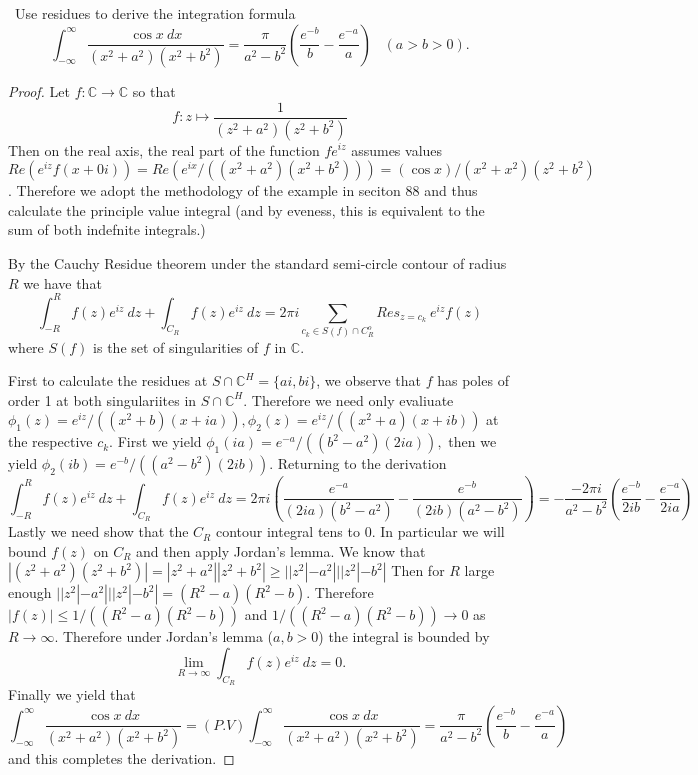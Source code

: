 \documentclass[11pt]{amsart}
\theoremstyle{definition}
\numberwithin{theorem}{section}
\numberwithin{definition}{section}
\numberwithin{equation}{section}
\newcommand{\parens}[1]{ \left( #1 \right) }
\begin{document}
\medskip {}\ Use residues to derive the integration formula
\begin{equation*}
	\int_{-\infty}^\infty \frac{\cos x\ dx}{(x^2 + a^2)(x^2 + b^2)} = \frac{\pi}{a^2 - b^2} \left(\frac{e^{-b}}{b} - \frac{e^{-a}}{a}\right) \;\;\; (a > b > 0).
\end{equation*}
\begin{proof}
	Let $f: \mathbb{C} \to \mathbb{C}$ so that 
	\begin{equation*}
		f: z \mapsto \frac{1}{(z^2 + a^2)(z^2 + b^2)}
	\end{equation*}
	Then on the real axis, the real part of the  function $fe^{iz}$ assumes values $Re(e^{iz}f(x + 0i)) = Re(e^{ix}/((x^2 + a^2)(x^2 + b^2))) = (\cos x)/(x^2 + x^2)(z^2 + b^2)$. Therefore we adopt the methodology of the example in seciton 88 and thus calculate the principle value integral (and by eveness, this is equivalent to the sum of both indefnite integrals.)

	By the Cauchy Residue theorem under the standard semi-circle contour of radius $R$ we have that
	\begin{equation*}
		\int_{-R}^R f(z)e^{iz}\ dz + \int_{C_R} f(z) e^{iz}\ dz = 2\pi i \sum_{c_k \in S(f) \cap C_R^o} Res_{z=c_k}\ e^{iz} f(z)
	\end{equation*}
	where $S(f)$ is the set of singularities of $f$ in $\mathbb{C}.$

	First to calculate the residues at $S \cap \mathbb{C}^H = \{ai, bi\}$, we observe that $f$ has poles of order 1 at both singulariites in $S \cap \mathbb{C}^H$. Therefore we need only evaliuate $\phi_1(z) = e^{iz}/((x^2 + b)(x+ ia)), \phi_2(z) = e^{iz}/((x^2 + a)(x + ib))$ at the respective $c_k$. First we yield $\phi_1(ia) = e^{-a}/((b^2 -a^2)(2ia)),$ then we yield $\phi_2(ib) = e^{-b}/((a^2 - b^2)(2ib))$. Returning to the derivation
	\begin{equation*}
		\int_{-R}^R f(z)e^{iz}\ dz + \int_{C_R} f(z) e^{iz}\ dz = 2\pi i \parens{\frac{e^{-a}}{(2ia)(b^2 - a^2)} - \frac{e^{-b}}{(2ib)(a^2 - b^2)}} = -\frac{-2 \pi i}{a^2 - b^2} \parens{\frac{e^{-b}}{2ib} - \frac{e^{-a}}{2ia}} 
	\end{equation*}
	Lastly we need show that the $C_R$ contour integral tens to $0$.  In particular we will  bound $f(z)$ on $C_R$
	and then apply Jordan's lemma.  We know that $|(z^2 + a^2)(z^2 + b^2)| = |z^2 + a^2||z^2 + b^2| \geq ||z^2| - a^2|||z^2| - b^2|$ Then for $R$ large enough $||z^2| - a^2|||z^2| - b^2| = (R^2 -a)(R^2 - b).$
	Therefore $|f(z)| \leq 1/((R^2 -a)(R^2 - b))$ and $1/((R^2 -a)(R^2 - b)) \to 0$ as $R \to \infty.$
	Therefore under Jordan's lemma ($a ,b > 0$) the integral is bounded by
	\begin{equation*}
		\lim_{R \to \infty} \int_{C_R} f(z) e^{iz}\ dz = 0.
	\end{equation*}
	Finally we yield that
	\begin{equation*}
		\int_{-\infty}^\infty \frac{\cos x\ dx}{(x^2 + a^2)(x^2 + b^2)}  = (P.V)\int_{-\infty}^\infty \frac{\cos x\ dx}{(x^2 + a^2)(x^2 + b^2)}  =  \frac{\pi }{a^2 - b^2} \parens{\frac{e^{-b}}{b} - \frac{e^{-a}}{a}} 
	\end{equation*}
	and this completes the derivation.
\end{proof}
\end{document}
